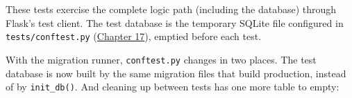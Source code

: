 \begin{codebox}
\begin{Shaded}
\begin{Highlighting}[]
\OperatorTok{=}\NormalTok{)}
    \OperatorTok{==} 

\OperatorTok{=}\OperatorTok{=}\NormalTok{\{}\NormalTok{: }\NormalTok{\})}
\OperatorTok{=}\NormalTok{ create\_response.get\_json()[}\NormalTok{]}

\OperatorTok{=}\SpecialCharTok{\{}\SpecialCharTok{\}}\NormalTok{)}
    \OperatorTok{==} 

\OperatorTok{=}\SpecialCharTok{\{}\SpecialCharTok{\}}\NormalTok{)}
    \OperatorTok{==} 
\end{Highlighting}
\end{Shaded}

\end{codebox}

\noindent{}These tests exercise the complete logic path (including the database) through Flask's test client. The test database is the temporary SQLite file configured in \texttt{tests/conftest.py} (\hyperref[ch:17-build-process]{Chapter 17}), emptied before each test.

With the migration runner, \texttt{conftest.py} changes in two places. The test database is now built by the same migration files that build production, instead of by \texttt{init\_db()}. And cleaning up between tests has one more table to empty:

